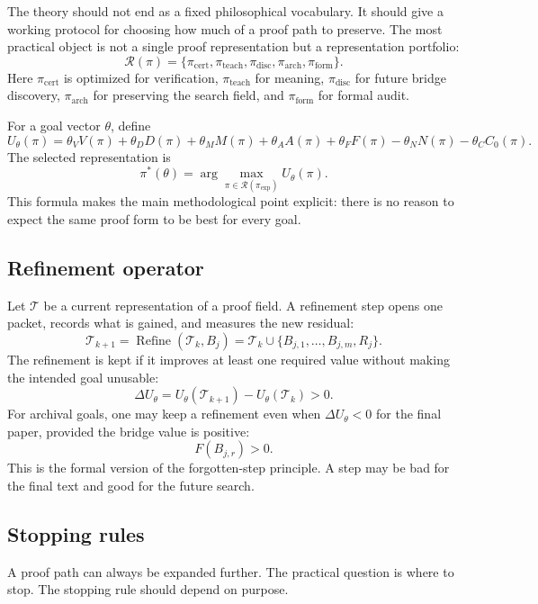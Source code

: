\documentclass[11pt,oneside]{book}
\theoremstyle{remark}
\begin{document}
The theory should not end as a fixed philosophical vocabulary.  It should give a working protocol for choosing how much of a proof path to preserve.  The most practical object is not a single proof representation but a representation portfolio:
\[
        \mathcal R(\pi)=
        \{\pi_{\mathrm{cert}},\pi_{\mathrm{teach}},\pi_{\mathrm{disc}},\pi_{\mathrm{arch}},\pi_{\mathrm{form}}\}.
\]
Here $\pi_{\mathrm{cert}}$ is optimized for verification, $\pi_{\mathrm{teach}}$ for meaning, $\pi_{\mathrm{disc}}$ for future bridge discovery, $\pi_{\mathrm{arch}}$ for preserving the search field, and $\pi_{\mathrm{form}}$ for formal audit.

For a goal vector $\theta$, define
\[
        U_\theta(\pi)
        =\theta_VV(\pi)+\theta_DD(\pi)+\theta_MM(\pi)+\theta_AA(\pi)+\theta_FF(\pi)
        -\theta_NN(\pi)-\theta_CC_0(\pi).
\]
The selected representation is
\[
        \pi^*(\theta)=\arg\max_{\pi\in\mathcal R(\pi_{\mathrm{exp}})}U_\theta(\pi).
\]
This formula makes the main methodological point explicit: there is no reason to expect the same proof form to be best for every goal.

\subsection{Refinement operator}

Let $\mathcal T$ be a current representation of a proof field.  A refinement step opens one packet, records what is gained, and measures the new residual:
\[
        \mathcal T_{k+1}=\operatorname{Refine}(\mathcal T_k,B_j)
        =\mathcal T_k\cup\{B_{j,1},\ldots,B_{j,m},R_j\}.
\]
The refinement is kept if it improves at least one required value without making the intended goal unusable:
\[
        \Delta U_\theta
        =U_\theta(\mathcal T_{k+1})-U_\theta(\mathcal T_k)>0.
\]
For archival goals, one may keep a refinement even when $\Delta U_\theta<0$ for the final paper, provided the bridge value is positive:
\[
        F(B_{j,r})>0.
\]
This is the formal version of the forgotten-step principle.  A step may be bad for the final text and good for the future search.

\subsection{Stopping rules}

A proof path can always be expanded further.  The practical question is where to stop.  The stopping rule should depend on purpose.
\end{document}
